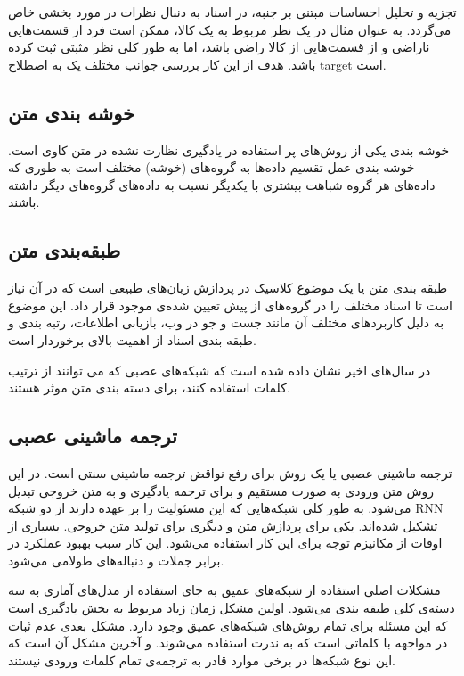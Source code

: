 \documentclass[12pt, a4paper, oneside]{report}
\begin{document}
تجزیه و تحلیل احساسات مبتنی بر جنبه، در اسناد به دنبال نظرات در مورد بخشی خاص می‌گردد. به عنوان مثال در یک نظر
مربوط به یک کالا، ممکن است فرد از قسمت‌هایی ناراضی و از قسمت‌هایی از کالا راضی باشد، اما به طور کلی نظر مثبتی
ثبت کرده باشد. هدف از این کار بررسی جوانب مختلف یک به اصطلاح
target
است.
\cite{zhang2018deep}

\subsection{خوشه بندی متن}

خوشه بندی
یکی از روش‌های پر استفاده در یادگیری نظارت نشده در متن کاوی است. خوشه بندی عمل تقسیم داده‌ها به گروه‌های
(خوشه)
مختلف است به طوری که داده‌های هر گروه شباهت بیشتری با یکدیگر نسبت به داده‌های گروه‌های دیگر داشته باشند\cite{DBLP:journals/corr/AllahyariPASTGK17a}.


\subsection{طبقه‌بندی متن}

طبقه بندی متن یا 
یک موضوع کلاسیک در پردازش زبان‌های طبیعی است که در آن نیاز است تا اسناد مختلف را در گروه‌های
از پیش تعیین شده‌ی موجود قرار داد\cite{c9d4fbeac7324056bed5d1cb262a7268}.
این موضوع به دلیل کاربرد‌های مختلف آن مانند جست و جو در وب، بازیابی اطلاعات،
رتبه بندی و طبقه بندی اسناد از اهمیت بالای برخوردار است\cite{joulin2016fasttext}.

در سال‌های اخیر نشان داده شده است که شبکه‌های عصبی که می توانند از ترتیب کلمات استفاده کنند،
برای دسته بندی متن موثر هستند\cite{iyyer-etal-2015-deep}.

\subsection{ترجمه ماشینی عصبی}
ترجمه ماشینی عصبی یا
یک روش برای رفع نواقض ترجمه ماشینی سنتی است. در این روش متن ورودی به صورت مستقیم و
برای ترجمه یادگیری و به متن خروجی تبدیل می‌شود.
به طور کلی شبکه‌هایی که این مسئولیت را بر عهده دارند از دو شبکه
RNN
تشکیل شده‌اند. یکی برای پردازش متن و دیگری برای تولید متن خروجی.
بسیاری از اوقات از مکانیزم توجه برای این کار استفاده می‌شود.
این کار سبب بهبود عملکرد در برابر جملات و دنباله‌های طولامی می‌شود.

مشکلات اصلی استفاده از شبکه‌های عمیق به جای استفاده از مدل‌های آماری به سه دسته‌ی کلی طبقه بندی می‌شود.
اولین مشکل زمان زیاد مربوط به بخش یادگیری است که این مسئله برای تمام روش‌های شبکه‌های عمیق وجود دارد.
مشکل بعدی عدم ثبات در مواجهه با کلماتی است که به ندرت استفاده می‌شوند.
و آخرین مشکل آن است که این نوع شبکه‌ها در برخی موارد قادر به ترجمه‌ی تمام کلمات ورودی نیستند.\cite{wu2016google}
\end{document}

